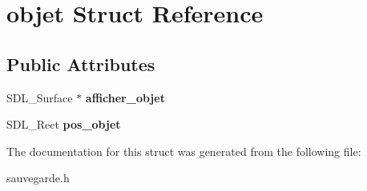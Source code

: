 \hypertarget{structobjet}{}\section{objet Struct Reference}
\label{structobjet}
\subsection*{Public Attributes}
\begin{DoxyCompactItemize}
\item 
\mbox{\label{structobjet_a75e78dd718abd857963ce550f25b32a8}} 
S\+D\+L\+\_\+\+Surface $\ast$ {\bfseries afficher\+\_\+objet}
\item 
\mbox{\label{structobjet_ac06440d9c09a3d500b8244b74ff3ae42}} 
S\+D\+L\+\_\+\+Rect {\bfseries pos\+\_\+objet}
\end{DoxyCompactItemize}


The documentation for this struct was generated from the following file\+:\begin{DoxyCompactItemize}
\item 
sauvegarde.\+h\end{DoxyCompactItemize}
